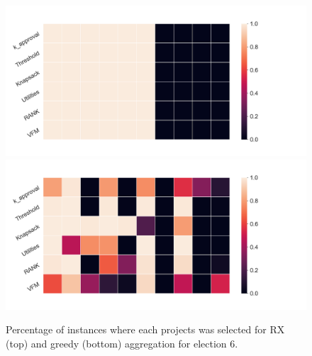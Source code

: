 \documentclass[10pt]{article}
\begin{document}
\begin{appendices}
\begin{figure}[!htbp]
\begin{center}
\includegraphics[width=18cm]{experiment/election_6_rx.png}
\includegraphics[width=18cm]{experiment/election_6_greedy.png}
\caption{Percentage of instances where each projects was selected for RX (top) and greedy (bottom)
aggregation for election 6.
}\label{fig:stability6}
\end{center}
\end{figure}

\begin{figure}[!htbp]
\begin{center}


\end{center}
\end{figure}
\end{appendices}
\end{document}
